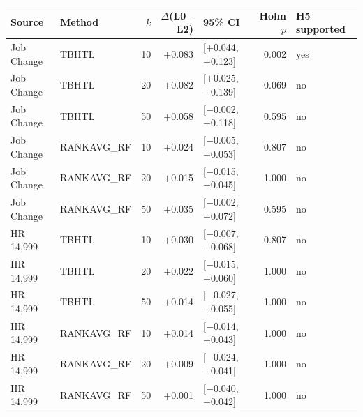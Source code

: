 \begin{tabular}{llrrlrl}
\hline
Source & Method & $k$ & $\Delta$(L0$-$L2) & 95\% CI & Holm $p$ & H5 supported \\
\hline
Job Change & TBHTL & 10 & $+$0.083 & [$+$0.044, $+$0.123] & 0.002 & yes \\
Job Change & TBHTL & 20 & $+$0.082 & [$+$0.025, $+$0.139] & 0.069 & no \\
Job Change & TBHTL & 50 & $+$0.058 & [$-$0.002, $+$0.118] & 0.595 & no \\
Job Change & RANKAVG\_RF & 10 & $+$0.024 & [$-$0.005, $+$0.053] & 0.807 & no \\
Job Change & RANKAVG\_RF & 20 & $+$0.015 & [$-$0.015, $+$0.045] & 1.000 & no \\
Job Change & RANKAVG\_RF & 50 & $+$0.035 & [$-$0.002, $+$0.072] & 0.595 & no \\
HR 14,999 & TBHTL & 10 & $+$0.030 & [$-$0.007, $+$0.068] & 0.807 & no \\
HR 14,999 & TBHTL & 20 & $+$0.022 & [$-$0.015, $+$0.060] & 1.000 & no \\
HR 14,999 & TBHTL & 50 & $+$0.014 & [$-$0.027, $+$0.055] & 1.000 & no \\
HR 14,999 & RANKAVG\_RF & 10 & $+$0.014 & [$-$0.014, $+$0.043] & 1.000 & no \\
HR 14,999 & RANKAVG\_RF & 20 & $+$0.009 & [$-$0.024, $+$0.041] & 1.000 & no \\
HR 14,999 & RANKAVG\_RF & 50 & $+$0.001 & [$-$0.040, $+$0.042] & 1.000 & no \\
\hline
\end{tabular}
